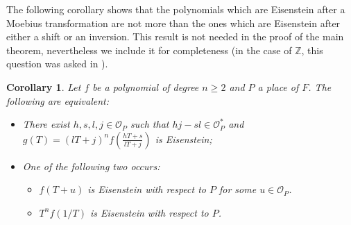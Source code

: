 \documentclass[10pt]{amsart}
\newcommand{\vZ}{\mathbb{Z}}
\newcommand{\cO}{\mathcal{O}}
\newtheorem{corollary}[theorem]{Corollary}
\theoremstyle{definition}
\theoremstyle{remark}
\numberwithin{equation}{section}
\begin{document}
The following corollary shows that the polynomials which are Eisenstein after a Moebius transformation are not more than the ones which are Eisenstein after either a shift or an inversion. This result is not needed in the proof of the main theorem, nevertheless we include it for completeness (in the case of $\vZ$, this question was asked in \cite{bib:heyman2014shifted}).
\begin{corollary}
Let $f$ be a polynomial of degree $n\geq 2$ and $P$ a place of $F$. The following are equivalent:
\begin{itemize}
\item[(i)] There exist $h,s,l,j\in \cO_P$ such that $hj-sl\in \cO_P^*$ and $g(T)=(lT+j)^n f(\frac{hT+s}{lT+j})$ is Eisenstein;
\item[(ii)] One of the following two occurs: 
\begin{itemize}
\item $f(T+u)$ is Eisenstein with respect to $P$ for some $u\in \cO_P$.
\item $T^nf(1/T)$ is Eisenstein with respect to $P$.
\end{itemize}
\end{itemize}  
\end{corollary}
\end{document}
